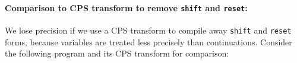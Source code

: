 \paragraph{Comparison to CPS transform to remove {\tt shift} and {\tt reset}:}{
We lose precision if we use a CPS transform to compile away {\tt shift} and {\tt reset} forms, because variables are treated less precisely than continuations.
%
%
%
Consider the following program and its CPS transform for comparison:
\begin{small}
\begin{SCodeFlow}\begin{RktBlk}\begin{SingleColumn}\RktPn{(}\mbox{}\RktPn{(}\RktPn{[}\mbox{}\RktPn{(}\RktSym{$\lambda$}\mbox{}\RktPn{(}\RktPn{)}\mbox{}\RktPn{)}\RktPn{]}

\mbox{}\RktPn{[}\mbox{}\RktPn{(}\RktSym{$\lambda$}\mbox{}\RktPn{(}\RktPn{)}\mbox{}\RktPn{(}\mbox{}\mbox{}\RktPn{(}\mbox{}\RktPn{(}\mbox{}\RktPn{)}\RktPn{)}\RktPn{)}\RktPn{)}\RktPn{]}

\mbox{}\RktPn{[}\mbox{}\RktPn{(}\RktSym{$\lambda$}\mbox{}\RktPn{(}\RktPn{)}\mbox{}\RktPn{(}\mbox{}\RktPn{(}\mbox{}\RktPn{(}\mbox{}\RktPn{)}\RktPn{)}\RktPn{)}\RktPn{)}\RktPn{]}\RktPn{)}


\end{SingleColumn}
\end{RktBlk}
\end{SCodeFlow}
\end{small}}
